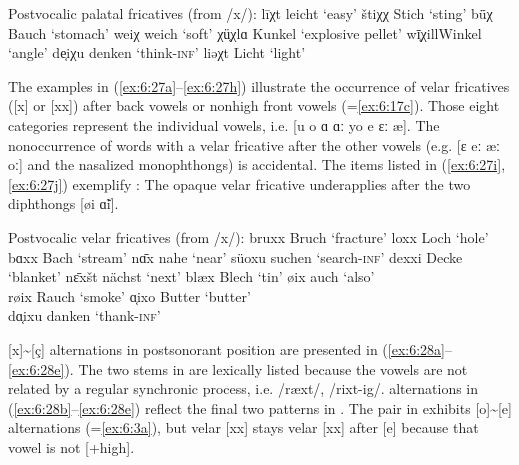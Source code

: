 \ea%
Postvocalic palatal fricatives (from /x/):\label{ex:6:26}
\ea\label{ex:6:26a}  līχt   \tab [liːçt]         \tab  leicht  \tab ‘easy’    
\ex\label{ex:6:26b}  štiχχ   \tab [ʃtiçç]         \tab  Stich   \tab ‘sting’   
\ex\label{ex:6:26c}  bǖχ    \tab [byːç]          \tab  Bauch   \tab ‘stomach’ 
\ex\label{ex:6:26d}  weiχ   \tab [weiç]          \tab  weich   \tab ‘soft’    
\ex\label{ex:6:26e}  χü͔χlɑ \tab  [çỹːçlɑ]       \tab   Kunkel \tab  ‘explosive pellet’   
\ex\label{ex:6:26f}  wī͔χill\tab  [w{\~\i}ːçill] \tab   Winkel \tab  ‘angle’              
\ex\label{ex:6:26g}  de͔iχu \tab  [dẽiçu]        \tab   denken \tab  ‘think-\textsc{inf}’ 
\ex\label{ex:6:26h}  liǝχt  \tab [liæçt]         \tab  Licht   \tab ‘light’               
\z 
\z

The examples in (\ref{ex:6:27a}--\ref{ex:6:27h}) illustrate the occurrence of velar fricatives ([x] or [xx]) after back vowels or nonhigh front vowels (=\ref{ex:6:17c}). Those eight categories represent the individual vowels, i.e. [u o ɑ ɑː yo e ɛː æ]. The nonoccurrence of words with a velar fricative after the other vowels (e.g. [ɛ eː æː oː] and the nasalized monophthongs) is accidental. The items listed in (\ref{ex:6:27i}, \ref{ex:6:27j}) exemplify : The opaque velar fricative underapplies after the two diphthongs [øi \~ɑi].

\ea%
\label{ex:6:27}Postvocalic velar fricatives (from /x/):
\ea\label{ex:6:27a} bruxx  \tab [bruxx]  \tab Bruch   \tab ‘fracture’ 
\ex\label{ex:6:27b} loxx   \tab [loxx]   \tab Loch    \tab ‘hole’     
\ex\label{ex:6:27c} bɑxx   \tab [bɑxx]   \tab Bach    \tab ‘stream’   
\ex\label{ex:6:27d} nɑ̄x    \tab [nɑːx]   \tab nahe    \tab ‘near’     
\ex\label{ex:6:27e} süoxu  \tab [syoxu]  \tab suchen  \tab ‘search-\textsc{inf}’  
\ex\label{ex:6:27f} dexxi  \tab [dexxi]  \tab Decke   \tab ‘blanket’  
\ex\label{ex:6:27g} nɛ̄xšt  \tab [nɛːxʃt] \tab nächst  \tab ‘next’     
\ex\label{ex:6:27h} blæx   \tab [blæx]   \tab Blech   \tab ‘tin’      
\ex\label{ex:6:27i} øix    \tab [øix]    \tab auch    \tab ‘also’     \\
    røix   \tab [røix]   \tab Rauch   \tab ‘smoke’    
\ex\label{ex:6:27j} ɑ͔ixo  \tab  [\~ɑixo]  \tab  Butter \tab  ‘butter’  \\
    dɑ͔ixu \tab  [d\~ɑixu] \tab  danken \tab  ‘thank-\textsc{inf}’ 
    \z
\z 

[x]{\textasciitilde}[ç] alternations in postsonorant position are presented in (\ref{ex:6:28a}--\ref{ex:6:28e}). The two stems in  are lexically listed because the vowels are not related by a regular synchronic process, i.e. /ræxt/, /rixt-ig/.  alternations in (\ref{ex:6:28b}--\ref{ex:6:28e}) reflect the final two patterns in . The pair in  exhibits [o]{\textasciitilde}[e]  alternations (=\ref{ex:6:3a}), but velar [xx] stays velar [xx] after [e] because that vowel is not [+high].


